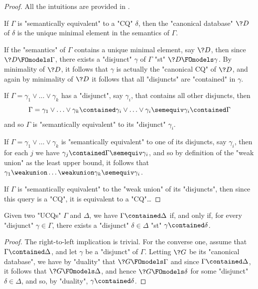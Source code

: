 \begin{proof}
	All the intuitions are provided in .
	
	 If $\Gamma$ is "semantically equivalent"
	to a "CQ" $\delta$, then the "canonical database" $\?D$ of $\delta$ is
	the unique minimal element in the semantics of $\Gamma$.

	 If the "semantics" of $\Gamma$
	contains a unique minimal element, say $\?D$, then since $\?D \FOmodels \Gamma$,
	there exists a "disjunct" $\gamma$ of $\Gamma$ "st" $\?D \FOmodels \gamma$.
	By minimality of $\?D$, it follows that $\gamma$ is actually the "canonical CQ" of $\?D$,
	and again by minimality of $\?D$ it follows that all "disjuncts" are "contained" in $\gamma$.

	 If $\Gamma = \gamma_1 \lor \dotsc \lor \gamma_k$
	has a "disjunct", say $\gamma_i$, that contains all other disjuncts, then
	\[
		\Gamma = \gamma_1 \lor \dotsc \lor \gamma_k \contained
		\gamma_i \lor \dotsc \lor \gamma_i \semequiv \gamma_i \contained \Gamma
	\]
	and so $\Gamma$ is "semantically equivalent" to its "disjunct" $\gamma_i$.

	 If $\Gamma = \gamma_1 \lor \dotsc \lor \gamma_k$ is "semantically equivalent" to
	one of its disjuncts, say $\gamma_i$, then
	for each $j$ we have $\gamma_j \contained \Gamma \semequiv \gamma_i$,
	and so by definition of the "weak union" as the least upper bound,
	it follows that $\gamma_1 \weakunion \dotsc \weakunion \gamma_k \semequiv \gamma_i$.

	 If $\Gamma$ is "semantically equivalent" to the
	"weak union" of its "disjuncts", then since this query is a "CQ", it
	is equivalent to a "CQ"…
\end{proof}

\begin{proposition}
	Given two "UCQs" $\Gamma$ and $\Delta$, we have $\Gamma \contained \Delta$
	if, and only if, for every "disjunct" $\gamma \in \Gamma$, there exists
	a "disjunct" $\delta \in \Delta$ "st" $\gamma \contained \delta$.
\end{proposition}

\begin{proof}
	The right-to-left implication is trivial.
	For the converse one, assume that $\Gamma \contained \Delta$,
	and let $\gamma$ be a "disjunct" of $\Gamma$.
	Letting $\?G$ be its "canonical database", we have by "duality" that
	$\?G \FOmodels \Gamma$
	and since $\Gamma \contained \Delta$, it follows that $\?G \FOmodels \Delta$,
	and hence $\?G \FOmodels \delta$ for some "disjunct" $\delta \in \Delta$,
	and so, by "duality", $\gamma \contained \delta$. 
\end{proof}

